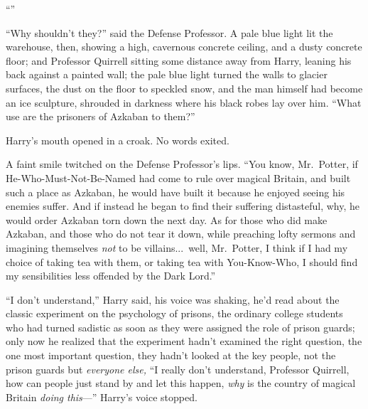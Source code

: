 “”

“Why shouldn’t they?” said the Defense Professor. A pale blue light lit the warehouse, then, showing a high, cavernous concrete ceiling, and a dusty concrete floor; and Professor Quirrell sitting some distance away from Harry, leaning his back against a painted wall; the pale blue light turned the walls to glacier surfaces, the dust on the floor to speckled snow, and the man himself had become an ice sculpture, shrouded in darkness where his black robes lay over him. “What use are the prisoners of Azkaban to them?”

Harry’s mouth opened in a croak. No words exited.

A faint smile twitched on the Defense Professor’s lips. “You know, Mr.~Potter, if He-Who-Must-Not-Be-Named had come to rule over magical Britain, and built such a place as Azkaban, he would have built it because he enjoyed seeing his enemies suffer. And if instead he began to find their suffering distasteful, why, he would order Azkaban torn down the next day. As for those who did make Azkaban, and those who do not tear it down, while preaching lofty sermons and imagining themselves \emph{not} to be villains...\ well, Mr.~Potter, I think if I had my choice of taking tea with them, or taking tea with You-Know-Who, I should find my sensibilities less offended by the Dark Lord.”

“I don’t understand,” Harry said, his voice was shaking, he’d read about the classic experiment on the psychology of prisons, the ordinary college students who had turned sadistic as soon as they were assigned the role of prison guards; only now he realized that the experiment hadn’t examined the right question, the one most important question, they hadn’t looked at the key people, not the prison guards but \emph{everyone else,} “I really don’t understand, Professor Quirrell, how can people just stand by and let this happen, \emph{why} is the country of magical Britain \emph{doing this}—” Harry’s voice stopped.

